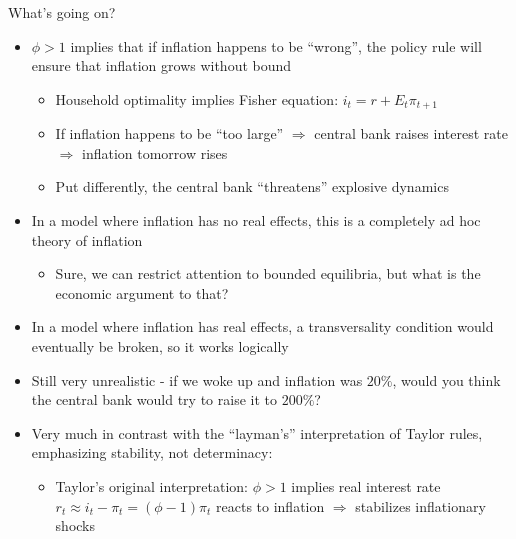 \documentclass[9pt,xcolor={dvipsnames}]{beamer}
\newcommand{\bit}{\begin{itemize}}
\newcommand{\eit}{\end{itemize}}
\newcommand{\bc}{\color{blue}}
\begin{document}
\begin{frame}{What's going on?}

\bit
\setlength\itemsep{1em}
\item $\phi>1$ implies that if inflation happens to be ``wrong'', the policy rule will ensure that inflation grows without bound
\bit
\setlength\itemsep{0.5em}
\item Household optimality implies {\bc Fisher equation}: $i_t = r + E_t \pi_{t+1}$

\item If inflation happens to be ``too large'' $\Rightarrow$ central bank raises interest rate $\Rightarrow$ inflation tomorrow rises

\item Put differently, the central bank ``threatens'' explosive dynamics
\eit


\item In a model where inflation has no real effects, this is a completely ad hoc theory of inflation
\bit
\item Sure, we can restrict attention to bounded equilibria, but what is the economic argument to that?
\eit

\item In a model where inflation has real effects, a transversality condition would eventually be broken, so it works logically

\item Still very unrealistic - if we woke up and inflation was $20 \%$, would you think the central bank would try to raise it to $200 \%$?

\item Very much in contrast with the ``layman's'' interpretation of Taylor rules, emphasizing stability, not determinacy:
\bit
\setlength\itemsep{0.5em}

\item Taylor's original interpretation: $\phi>1$ implies real interest rate $r_t \approx i_t-\pi_t = (\phi- 1)\pi_t$ reacts to inflation $\Rightarrow$ stabilizes inflationary shocks

\eit

\eit

\end{frame}
\end{document}

